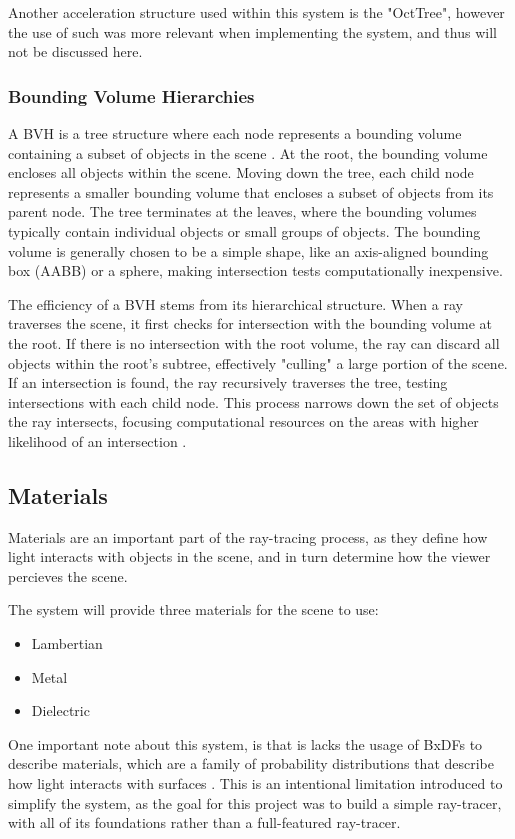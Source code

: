 \documentclass[../main.tex]{subfiles}
\begin{document}
Another acceleration structure used within this system is the "OctTree", however the use of such was more relevant when implementing the system, and thus will 
not be discussed here.

\subsubsection{Bounding Volume Hierarchies}
A BVH is a tree structure where each node represents a bounding volume containing a subset of objects in the scene \cite{wald_fast_2007}.
At the root, the bounding volume encloses all objects within the scene. Moving down the tree, each child node represents a smaller bounding 
volume that encloses a subset of objects from its parent node. The tree terminates at the leaves, where the bounding volumes 
typically contain individual objects or small groups of objects. The bounding volume is generally chosen to be a simple shape, 
like an axis-aligned bounding box (AABB) or a sphere, making intersection tests computationally inexpensive.

The efficiency of a BVH stems from its hierarchical structure. When a ray traverses the scene, it first checks for intersection with 
the bounding volume at the root. If there is no intersection with the root volume, the ray can discard all objects within the root's 
subtree, effectively "culling" a large portion of the scene. If an intersection is found, the ray recursively traverses the tree, 
testing intersections with each child node. This process narrows down the set of objects the ray intersects, focusing computational 
resources on the areas with higher likelihood of an intersection \cite{wald_fast_2007}.

\subsection{Materials}
Materials are an important part of the ray-tracing process, as they define how light interacts with objects in the scene, and 
in turn determine how the viewer percieves the scene.

The system will provide three materials for the scene to use:
\begin{itemize}
  \item Lambertian
  \item Metal
  \item Dielectric
\end{itemize}

One important note about this system, is that is lacks the usage of BxDFs to describe materials, which are a family of probability distributions that
describe how light interacts with surfaces \cite{pharr_physically_2016}. This is an intentional limitation introduced to simplify the system, as the goal for this
project was to build a simple ray-tracer, with all of its foundations rather than a full-featured ray-tracer.
\end{document}
